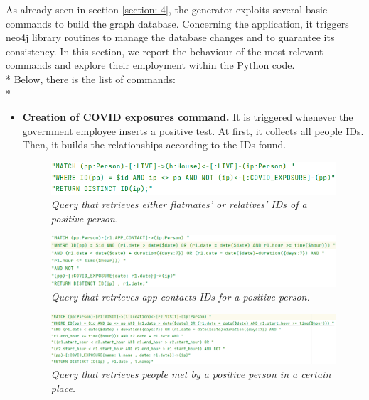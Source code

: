 \label{section: 6}
As already seen in section \ref{section: 4}, the generator exploits several basic commands to build the graph database. 
Concerning the application, it triggers neo4j library routines to manage the database changes and to guarantee its consistency. 
In this section, we report the behaviour of the most relevant commands and explore their employment within the Python code. \\*
Below, there is the list of commands: \\*
\begin{itemize}[leftmargin=*]
    \item \textbf{Creation of COVID exposures command.} It is triggered whenever the government employee inserts a positive test. At first, it collects all people IDs. Then, it builds the relationships according to the IDs found.
    \begin{figure}[h]
        \includegraphics[width=\textwidth]{images/create_covid_exposure_command/family_contacts.png}
        \captionsetup{skip=7pt}
        \caption{\textit{Query that retrieves either flatmates' or relatives' IDs of a positive person.}}
    \end{figure}
    \begin{figure}[h]
        \includegraphics[width=\textwidth]{images/create_covid_exposure_command/app_contacts.png}
        \captionsetup{skip=7pt}
        \caption{\emph{Query that retrieves app contacts IDs for a positive person.}}
    \end{figure}
    \begin{figure}[ht]
        \includegraphics[width=\textwidth]{images/create_covid_exposure_command/visit_contacts.png}
        \captionsetup{skip=7pt}
        \caption{\textit{Query that retrieves people met by a positive person in a certain place.}}

\end{figure}
\end{itemize}
